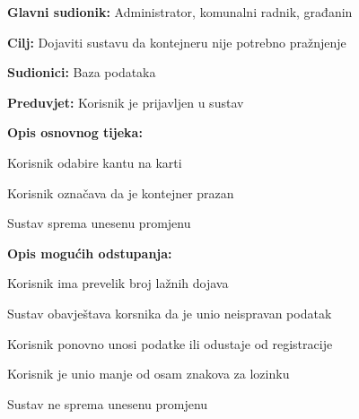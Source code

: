 				
				
					
				
				
					
				
				
					\noindent {}
					\begin{packed_item}
	
						\item \textbf{Glavni sudionik: }Administrator, komunalni radnik, građanin
						\item  \textbf{Cilj:} Dojaviti sustavu da kontejneru nije potrebno pražnjenje
						\item  \textbf{Sudionici:} Baza podataka
						\item  \textbf{Preduvjet:} Korisnik je prijavljen u sustav
						\item  \textbf{Opis osnovnog tijeka:}
						
						\item[] \begin{packed_enum}
	
							\item Korisnik odabire kantu na karti
							\item Korisnik označava da je kontejner prazan
							\item Sustav sprema unesenu promjenu
							
						\end{packed_enum}
						
						\item  \textbf{Opis mogućih odstupanja:}
						
						\item[] \begin{packed_item}
	
							\item[2.a] Korisnik ima prevelik broj lažnih dojava
							
							\item[] \begin{packed_enum}
								
								\item Sustav obavještava korsnika da je unio neispravan podatak
								\item Korisnik ponovno unosi podatke ili odustaje od registracije
								
							\end{packed_enum}
							\item[2.b] Korisnik je unio manje od osam znakova za lozinku
							
								\item[] \begin{packed_enum}
								
								\item Sustav ne sprema unesenu promjenu
								
							\end{packed_enum}
							
						\end{packed_item}
					\end{packed_item}
				
